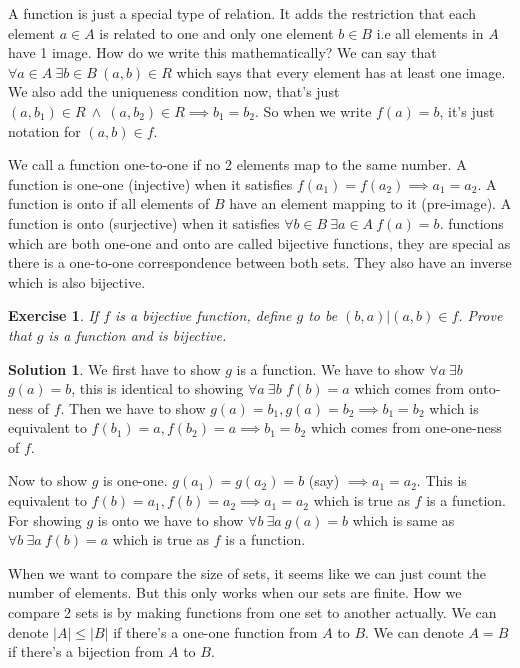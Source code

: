 \documentclass[a4paper,10pt]{article}
\newtheorem{exercise}{Exercise}[section]
\theoremstyle{definition} %
\newtheorem*{solution}{Solution}
\begin{document}
    A function is just a special type of relation. It adds the restriction that each element
    $a \in A$ is related to one and only one element $b \in B$ i.e all elements in $A$ have 
    1 image. How do we write this mathematically? We can say that 
    $\forall a \in A \ \exists b \in B \ (a,b) \in R$ which says that every element has at least
    one image. We also add the uniqueness condition now, that's just $(a, b_1) \in R \ \land \ 
    (a, b_2) \in R \implies b_1 = b_2$. So when we write $f(a) = b$, it's just notation for
    $(a,b) \in f$.

    We call a function one-to-one if no 2 elements map to the same number. A function is 
    one-one (injective) when it satisfies $f(a_1) = f(a_2) \implies a_1 = a_2$. A function 
    is onto if all elements of $B$ have an element mapping to it (pre-image). A function is 
    onto (surjective) when it satisfies $\forall b \in B \ \exists a \in A \ f(a) = b$. functions
    which are both one-one and onto are called bijective functions, they are special as there
    is a one-to-one correspondence between both sets. They also have an inverse which is also 
    bijective.

    \begin{exercise}
        If $f$ is a bijective function, define $g$ to be $(b,a) | (a,b) \in f$. Prove that
        $g$ is a function and is bijective.
    \end{exercise}

    \begin{solution}
        We first have to show $g$ is a function. We have to show $\forall a \ \exists b$
        $g(a) = b$, this is identical to showing $\forall a \ \exists b$ $f(b) = a$ which 
        comes from onto-ness of $f$. Then we have to show $g(a) = b_1, g(a) = b_2 \implies 
        b_1 = b_2$ which is equivalent to $f(b_1) = a, f(b_2) = a \implies b_1 = b_2$ which
        comes from one-one-ness of $f$. 

        Now to show $g$ is one-one. $g(a_1) = g(a_2) = b$ (say) $\implies a_1 = a_2$. This 
        is equivalent to $f(b) = a_1, f(b) = a_2 \implies a_1 = a_2$ which is true as $f$ is 
        a function. For showing $g$ is onto we have to show $\forall b \ \exists a \ g(a) = b$
        which is same as $\forall b \ \exists a \ f(b) = a$ which is true as $f$ is a function.
    \end{solution}

    When we want to compare the size of sets, it seems like we can just count the number of elements.
    But this only works when our sets are finite. How we compare 2 sets is by making functions
    from one set to another actually. We can denote $|A| \leq |B|$ if there's a one-one function
    from $A$ to $B$. We can denote $A = B$ if there's a bijection from $A$ to $B$.
\end{document}

